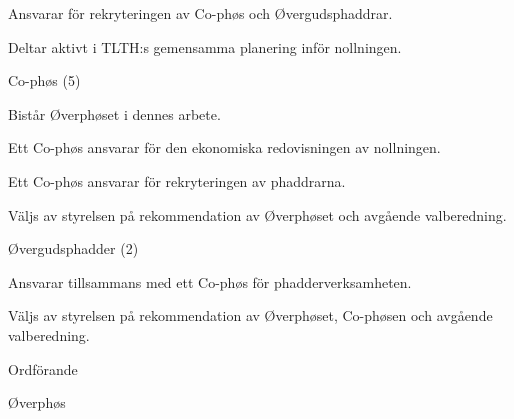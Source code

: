 \documentclass[../_main/handlingar.tex]{subfiles}
\begin{document}
\begin{attsatser}
\begin{emptylist}
\begin{dashlist}
                \item Ansvarar för rekryteringen av Co-phøs och Øvergudsphaddrar.
                \item Deltar aktivt i TLTH:s gemensamma planering inför nollningen.
            \end{dashlist}
        \item Co-phøs (5)
            \begin{dashlist}
                \item Bistår Øverphøset i dennes arbete.
                \item Ett Co-phøs ansvarar för den ekonomiska redovisningen av nollningen.
                \item Ett Co-phøs ansvarar för rekryteringen av phaddrarna.
                \item Väljs av styrelsen på rekommendation av Øverphøset och avgående valberedning.
            \end{dashlist}
        \item Øvergudsphadder (2)
            \begin{dashlist}
                \item Ansvarar tillsammans med ett Co-phøs för phadderverksamheten.
                \item Väljs av styrelsen på rekommendation av Øverphøset, Co-phøsen och avgående valberedning.
            \end{dashlist}
    \end{emptylist}
\end{attsatser}

\begin{signatures}{2}
    \ist
    \signature{\ordf}{Ordförande}
    \signature{Niklas Gustafson}{Øverphøs}
\end{signatures}
\end{document}
